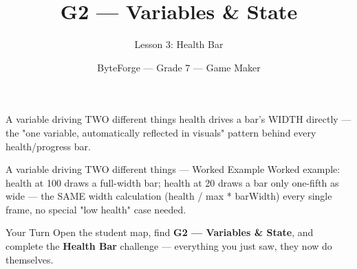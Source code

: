 \documentclass[aspectratio=169]{beamer}
\title{G2 — Variables \& State}
\subtitle{Lesson 3: Health Bar}
\author{ByteForge --- Grade 7 --- Game Maker}
\date{}
\begin{document}
\begin{frame}
    \titlepage
\end{frame}

\begin{frame}{A variable driving TWO different things}
    \Large
    health drives a bar's WIDTH directly — the "one variable, automatically reflected in visuals" pattern behind every health/progress bar.

    \begin{center}
    \end{center}
\end{frame}

\begin{frame}{A variable driving TWO different things --- Worked Example}
    \Large
    Worked example: health at 100 draws a full-width bar; health at 20 draws a bar only one-fifth as wide — the SAME width calculation (health / max * barWidth) every single frame, no special "low health" case needed.
\end{frame}

\begin{frame}{Your Turn}
    \Large
    Open the student map, find \textbf{G2 — Variables \& State}, and complete
    the \textbf{Health Bar} challenge --- everything you just saw, they now do themselves.
\end{frame}
\end{document}

